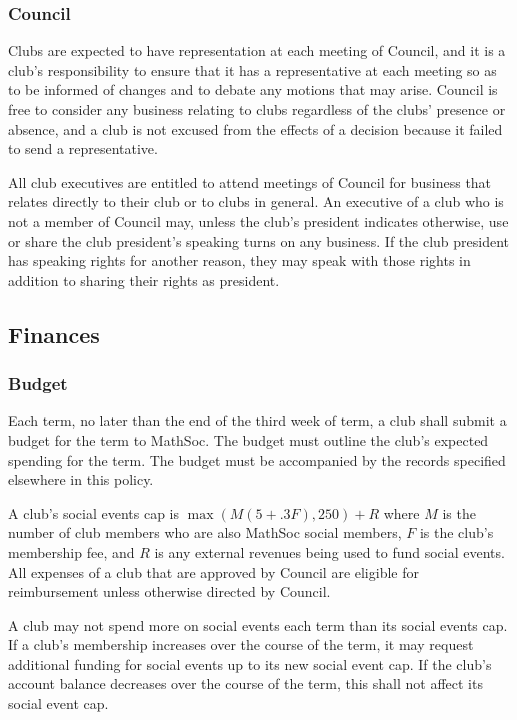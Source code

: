 \subsubsection{Council}
Clubs are expected to have representation at each meeting of Council, and it is
a club's responsibility to ensure that it has a representative at each meeting
so as to be informed of changes and to debate any motions that may arise.
Council is free to consider any business relating to clubs regardless of the
clubs' presence or absence, and a club is not excused from the effects of a
decision because it failed to send a representative.

All club executives are entitled to attend meetings of Council for business that
relates directly to their club or to clubs in general. An executive of a club
who is not a member of Council may, unless the club's president indicates
otherwise, use or share the club president's speaking turns on any business. If
the club president has speaking rights for another reason, they may speak with
those rights in addition to sharing their rights as president.

\subsection{Finances}
\subsubsection{Budget}
Each term, no later than the end of the third week of term, a club shall submit
a budget for the term to MathSoc. The budget must outline the club's expected
spending for the term. The budget must be accompanied by the records specified
elsewhere in this policy.

A club's social events cap is $\max(M(5 + .3F), 250) + R$ where $M$ is the
number of club members who are also MathSoc social members, $F$ is the
club's membership fee, and $R$ is any external revenues being used to fund
social events. All expenses of a club that are approved by Council are
eligible for reimbursement unless otherwise directed by Council.

A club may not spend more on social events each term than its social events cap.
If a club's membership increases over the course of the term, it may request
additional funding for social events up to its new social event cap. If the
club's account balance decreases over the course of the term, this shall not
affect its social event cap.

